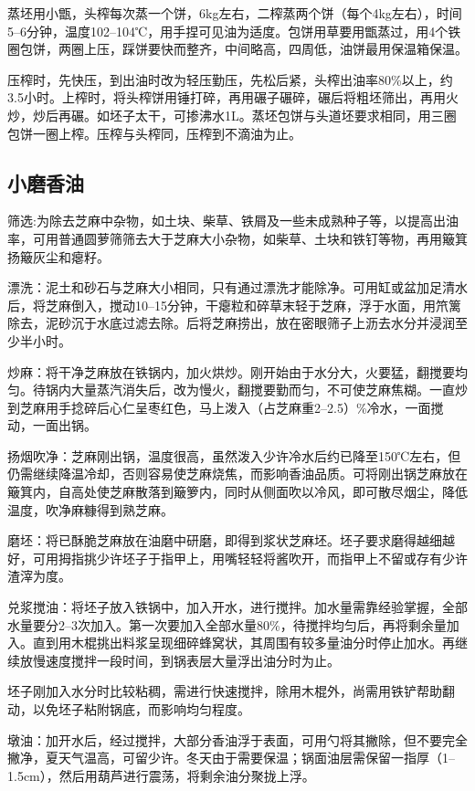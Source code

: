 \documentclass{ctexbook}
\begin{document}
蒸坯用小甑，头榨每次蒸一个饼，6kg左右，二榨蒸两个饼（每个4kg左右），时间5--6分钟，温度102--104℃，用手捏可见油为适度。包饼用草要用甑蒸过，用4个铁圈包饼，两圈上压，踩饼要快而整齐，中间略高，四周低，油饼最用保温箱保温。

压榨时，先快压，到出油时改为轻压勤压，先松后紧，头榨出油率80\%以上，约3.5小时。上榨时，将头榨饼用锤打碎，再用碾子碾碎，碾后将粗坯筛出，再用火炒，炒后再碾。如坯子太干，可掺沸水1L。蒸坯包饼与头道坯要求相同，用三圈包饼一圈上榨。压榨与头榨同，压榨到不滴油为止。

\subsection{小磨香油}
筛选:为除去芝麻中杂物，如土块、柴草、铁屑及一些未成熟种子等，以提高出油率，可用普通圆萝筛筛去大于芝麻大小杂物，如柴草、土块和铁钉等物，再用簸箕扬簸灰尘和瘪籽。

漂洗：泥土和砂石与芝麻大小相同，只有通过漂洗才能除净。可用缸或盆加足清水后，将芝麻倒入，搅动10--15分钟，干瘪粒和碎草末轻于芝麻，浮于水面，用笊篱除去，泥砂沉于水底过滤去除。后将芝麻捞出，放在密眼筛子上沥去水分并浸润至少半小时。

炒麻：将干净芝麻放在铁锅内，加火烘炒。刚开始由于水分大，火要猛，翻搅要均匀。待锅内大量蒸汽消失后，改为慢火，翻搅要勤而匀，不可使芝麻焦糊。一直炒到芝麻用手捻碎后心仁呈枣红色，马上泼入（占芝麻重2--2.5）\%冷水，一面搅动，一面出锅。

扬烟吹净：芝麻刚出锅，温度很高，虽然泼入少许冷水后约已降至150℃左右，但仍需继续降温冷却，否则容易使芝麻烧焦，而影响香油品质。可将刚出锅芝麻放在簸箕内，自高处使芝麻散落到簸箩内，同时从侧面吹以冷风，即可散尽烟尘，降低温度，吹净麻糠得到熟芝麻。

磨坯：将已酥脆芝麻放在油磨中研磨，即得到浆状芝麻坯。坯子要求磨得越细越好，可用拇指挑少许坯子于指甲上，用嘴轻轻将酱吹开，而指甲上不留或存有少许渣滓为度。

兑浆搅油：将坯子放入铁锅中，加入开水，进行搅拌。加水量需靠经验掌握，全部水量要分2--3次加入。第一次要加入全部水量80\%，待搅拌均匀后，再将剩余量加入。直到用木棍挑出料浆呈现细碎蜂窝状，其周围有较多量油分时停止加水。再继续放慢速度搅拌一段时间，到锅表层大量浮出油分时为止。

坯子刚加入水分时比较粘稠，需进行快速搅拌，除用木棍外，尚需用铁铲帮助翻动，以免坯子粘附锅底，而影响均匀程度。

墩油：加开水后，经过搅拌，大部分香油浮于表面，可用勺将其撇除，但不要完全撇净，夏天气温高，可留少许。冬天由于需要保温；锅面油层需保留一指厚（1--1.5cm），然后用葫芦进行震荡，将剩余油分聚拢上浮。
\end{document}
